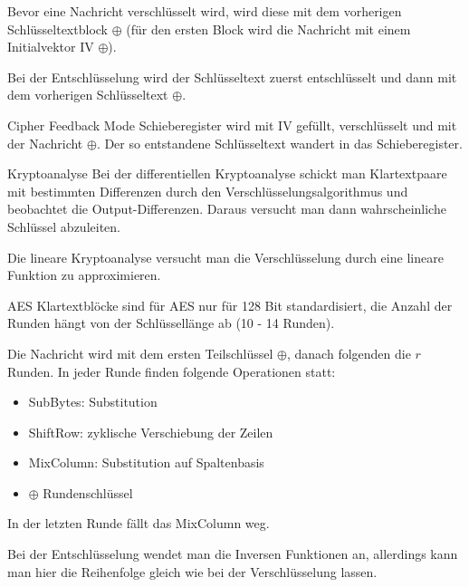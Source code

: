 \documentclass{article}
\begin{document}
	Bevor eine Nachricht verschlüsselt wird, wird diese mit dem vorherigen Schlüsseltextblock $\oplus$ (für den ersten Block wird die Nachricht mit einem Initialvektor IV $\oplus$).
	
	Bei der Entschlüsselung wird der Schlüsseltext zuerst entschlüsselt und dann mit dem vorherigen Schlüsseltext $\oplus$.
	
	\begin{exkurs}{Cipher Feedback Mode}
		Schieberegister wird mit IV gefüllt, verschlüsselt und mit der Nachricht $\oplus$. Der so entstandene Schlüsseltext wandert in das Schieberegister.
	\end{exkurs}
	
	\begin{exkurs}{Kryptoanalyse}
		Bei der differentiellen Kryptoanalyse schickt man Klartextpaare mit bestimmten Differenzen durch den Verschlüsselungsalgorithmus und beobachtet die Output-Differenzen. Daraus versucht man dann wahrscheinliche Schlüssel abzuleiten.
		
		Die lineare Kryptoanalyse versucht man die Verschlüsselung durch eine lineare Funktion zu approximieren.
	\end{exkurs}
	
	\begin{exkurs}{AES}
		Klartextblöcke sind für AES nur für 128 Bit standardisiert, die Anzahl der Runden hängt von der Schlüssellänge ab (10 - 14 Runden).
		
		Die Nachricht wird mit dem ersten Teilschlüssel $\oplus$, danach folgenden die $r$ Runden. In jeder Runde finden folgende Operationen statt:
		\begin{itemize}
			\item SubBytes: Substitution
			\item ShiftRow: zyklische Verschiebung der Zeilen
			\item MixColumn: Substitution auf Spaltenbasis
			\item $\oplus$ Rundenschlüssel
		\end{itemize}
		In der letzten Runde fällt das MixColumn weg.
		
		Bei der Entschlüsselung wendet man die Inversen Funktionen an, allerdings kann man hier die Reihenfolge gleich wie bei der Verschlüsselung lassen.
	\end{exkurs}
\end{document}
